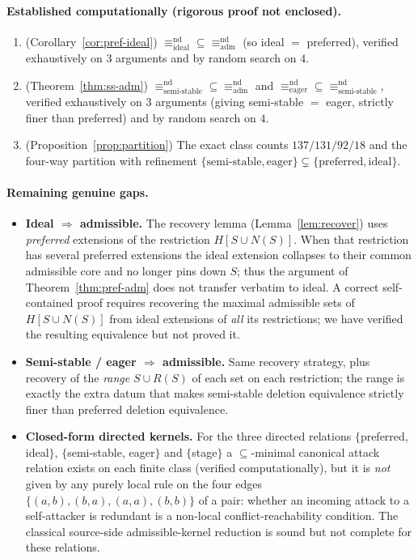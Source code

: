 \documentclass{amsart}
\theoremstyle{remark}
\begin{document}
\paragraph{Established computationally (rigorous proof not enclosed).}
\begin{enumerate}
\item[(7)] (Corollary~\ref{cor:pref-ideal}) $\equiv^{\mathrm{nd}}_{\mathrm{ideal}}
\subseteq\equiv^{\mathrm{nd}}_{\mathrm{adm}}$ (so ideal $=$ preferred), verified
exhaustively on $3$ arguments and by random search on $4$.
\item[(8)] (Theorem~\ref{thm:ss-adm}) $\equiv^{\mathrm{nd}}_{\mathrm{semi\text{-}
stable}}\subseteq\equiv^{\mathrm{nd}}_{\mathrm{adm}}$ and
$\equiv^{\mathrm{nd}}_{\mathrm{eager}}\subseteq
\equiv^{\mathrm{nd}}_{\mathrm{semi\text{-}stable}}$, verified exhaustively on $3$
arguments (giving semi-stable $=$ eager, strictly finer than preferred) and by
random search on $4$.
\item[(9)] (Proposition~\ref{prop:partition}) The exact class counts
$137/131/92/18$ and the four-way partition with refinement
$\{\mathrm{semi\text{-}stable},\mathrm{eager}\}\subsetneq
\{\mathrm{preferred},\mathrm{ideal}\}$.
\end{enumerate}

\paragraph{Remaining genuine gaps.}
\begin{itemize}
\item \textbf{Ideal $\Rightarrow$ admissible.}  The recovery lemma
(Lemma~\ref{lem:recover}) uses \emph{preferred} extensions of the restriction
$H[S\cup N(S)]$.  When that restriction has several preferred extensions the
ideal extension collapses to their common admissible core and no longer pins down
$S$; thus the argument of Theorem~\ref{thm:pref-adm} does not transfer verbatim
to ideal.  A correct self-contained proof requires recovering the maximal
admissible sets of $H[S\cup N(S)]$ from ideal extensions of \emph{all} its
restrictions; we have verified the resulting equivalence but not proved it.
\item \textbf{Semi-stable / eager $\Rightarrow$ admissible.}  Same recovery
strategy, plus recovery of the \emph{range} $S\cup R(S)$ of each set on each
restriction; the range is exactly the extra datum that makes semi-stable
deletion equivalence strictly finer than preferred deletion equivalence.
\item \textbf{Closed-form directed kernels.}  For the three directed relations
$\{$preferred, ideal$\}$, $\{$semi-stable, eager$\}$ and $\{$stage$\}$ a
$\subseteq$-minimal canonical attack relation exists on each finite class
(verified computationally), but it is \emph{not} given by any purely local rule
on the four edges $\{(a,b),(b,a),(a,a),(b,b)\}$ of a pair: whether an incoming
attack to a self-attacker is redundant is a non-local conflict-reachability
condition.  The classical source-side admissible-kernel reduction is sound but
not complete for these relations.
\end{itemize}
\end{document}
